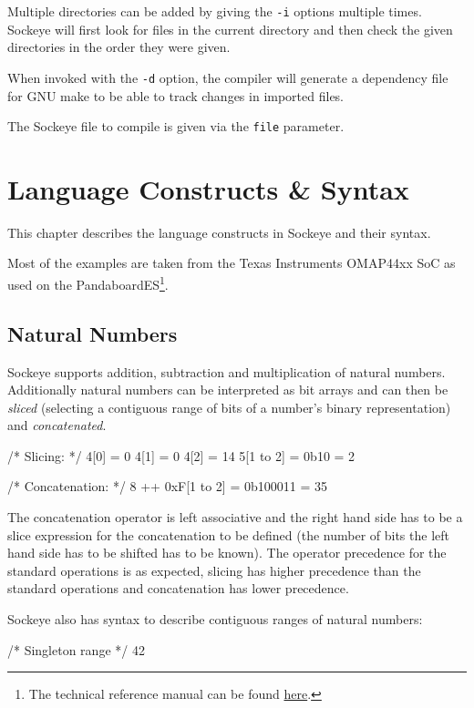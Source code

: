 \documentclass[a4paper,11pt,twoside]{report}
\begin{document}
{{{Multiple directories can be added by giving the \texttt{-i} options multiple times.
Sockeye will first look for files in the current directory and then check the given directories in the order they were given.

When invoked with the \texttt{-d} option, the compiler will generate a dependency file for GNU make to be able to track changes in imported files.

The Sockeye file to compile is given via the \texttt{file} parameter.


\chapter{Language Constructs \& Syntax}
\label{chap:syntax}
This chapter describes the language constructs in Sockeye and their syntax.

Most of the examples are taken from the Texas Instruments OMAP44xx SoC as used on the PandaboardES\footnote{The technical reference manual can be found \href{http://www.ti.com/lit/ug/swpu235ab/swpu235ab.pdf}{here}.}.

\section{Natural Numbers}
Sockeye supports addition, subtraction and multiplication of natural numbers.
Additionally natural numbers can be interpreted as bit arrays and can then be \emph{sliced} (selecting a contiguous range of bits of a number's binary representation) and \emph{concatenated}.
\begin{example}
  /* Slicing: */
  4[0] = 0
  4[1] = 0
  4[2] = 14
  5[1 to 2] = 0b10 = 2

  /* Concatenation: */
  8 ++ 0xF[1 to 2] = 0b100011 = 35
\end{example}

The concatenation operator is left associative and the right hand side has to be a slice expression for the concatenation to be defined (the number of bits the left hand side has to be shifted has to be known). The operator precedence for the standard operations is as expected, slicing has higher precedence than the standard operations and concatenation has lower precedence.

Sockeye also has syntax to describe contiguous ranges of natural numbers:
\begin{example}
  /* Singleton range */
  42


\end{example}}}}
\end{document}
